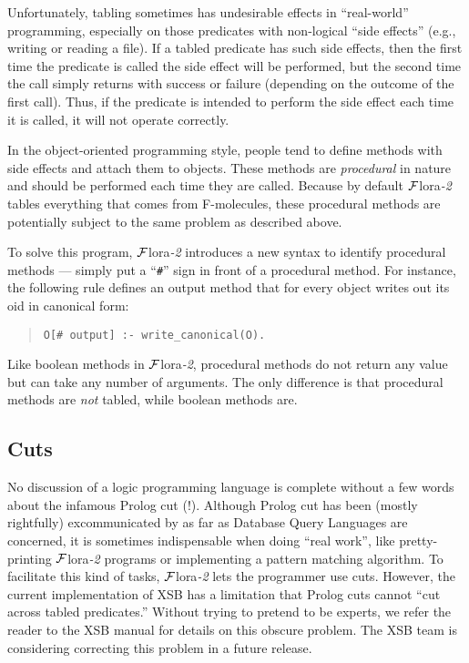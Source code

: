\documentclass[11pt]{article}
\newcommand{\FLORA}{{\mbox{${\cal F}${\sc lora}\rm\emph{-2}}}\xspace}
\begin{document}
%
Unfortunately, tabling sometimes has undesirable effects in
``real-world'' programming, especially on those predicates with
non-logical ``side effects'' (e.g., writing or reading a file).  If a
tabled predicate has such side effects, then the first time the predicate
is called the side effect will be performed, but the second time the call
simply returns with success or failure (depending on the outcome of the
first call).  Thus, if the predicate is intended to perform the side
effect each time it is called, it will not operate correctly.

In the object-oriented programming style, people tend to define
methods with side effects and attach them to objects. These methods
are \emph{procedural} in nature and should be performed each time they
are called. Because by default \FLORA tables everything that comes
from F-molecules, these procedural methods are potentially subject to
the same problem as described above.

To solve this program, \FLORA introduces a new syntax to identify
procedural methods --- simply put a ``\verb|#|'' sign in front of a
procedural method. For instance, the following rule defines an
output method that for every object writes out its oid in canonical
form:
\begin{quote}
\verb|O[# output] :- write_canonical(O).|
\end{quote}

Like boolean methods in \FLORA, procedural methods do not return any
value but can take any number of arguments. The only difference is that
procedural methods are \emph{not} tabled, while boolean methods are.


\subsection{Cuts}


\index{cuts in \FLORA}
No discussion of a logic programming language is complete without a few
words about the infamous Prolog cut (!). Although Prolog cut has been
(mostly rightfully) excommunicated by as far as Database Query Languages
are concerned, it is sometimes indispensable when doing ``real work'', like
pretty-printing \FLORA programs or implementing a pattern matching
algorithm.  To facilitate this kind of tasks, \FLORA lets the programmer
use cuts.  However, the current implementation of XSB has a limitation that
Prolog cuts cannot ``cut across tabled predicates.''  Without trying to
pretend to be experts, we refer the reader to the XSB manual for details on
this obscure problem. The XSB team is considering correcting this problem
in a future release.
\end{document}
